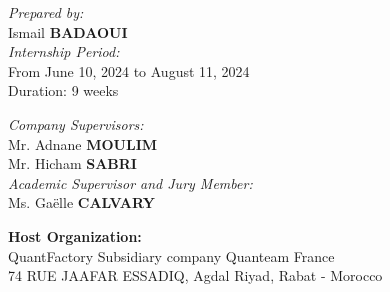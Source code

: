 \documentclass[12pt]{article}
\begin{document}
\begin{titlepage}
\begin{sffamily}
\begin{center}
    \begin{minipage}{0.48\textwidth}
      \begin{flushleft} \large
        \emph{Prepared by:}
        \\ \vspace{0.3cm} Ismail \textbf{BADAOUI}
        \\ \vspace{0.8cm}
        \emph{Internship Period:}
        \\ \vspace{0.3cm} From June 10, 2024 to August 11, 2024
        \\ \vspace{0.3cm} Duration: 9 weeks
      \end{flushleft}
    \end{minipage}
    \hfill
    \begin{minipage}{0.48\textwidth}
      \begin{flushright} \large
        \emph{Company Supervisors:} \\ \vspace{0.3cm} 
        Mr. Adnane \textbf{MOULIM} \\
        Mr. Hicham \textbf{SABRI} \\ \vspace{0.8cm}
        \emph{Academic Supervisor and Jury Member:} \\ \vspace{0.3cm} 
        Ms. Gaëlle \textbf{CALVARY}
      \end{flushright}
    \end{minipage}
  
    \vfill
    
    \large{\textbf{Host Organization:}}\\
    \vspace{0.3cm}
    QuantFactory Subsidiary company Quanteam France\\
    74 RUE JAAFAR ESSADIQ, Agdal Riyad, Rabat - Morocco
    
    \vspace*{\fill}
  \end{center}
  \end{sffamily}
\end{titlepage}

\newpage
\tableofcontents

\newpage
\end{document}

